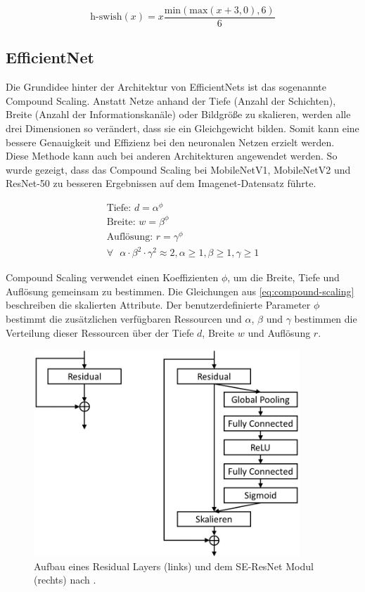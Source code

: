 \begin{equation}\label{eq:h-swish}
\text{h-swish}(x)=x\frac{\text{min}(\text{max}(x+3, 0), 6)}{6}
\end{equation}


\subsection{EfficientNet}
Die Grundidee hinter der Architektur von EfficientNets ist das sogenannte Compound Scaling. Anstatt Netze anhand der Tiefe (Anzahl der Schichten), Breite (Anzahl der Informationskanäle) oder Bildgröße zu skalieren, werden alle drei Dimensionen so verändert, dass sie ein Gleichgewicht bilden. Somit kann eine bessere Genauigkeit und Effizienz bei den neuronalen Netzen erzielt werden. Diese Methode kann auch bei anderen Architekturen angewendet werden. So wurde gezeigt, dass das Compound Scaling bei MobileNetV1, MobileNetV2 und ResNet-50 zu besseren Ergebnissen auf dem Imagenet-Datensatz führte. \cite{efficientnet}

\begin{equation}\label{eq:compound-scaling}
\begin{aligned}
\text{Tiefe: } d = \alpha^{\phi} \\
\text{Breite: } w = \beta^{\phi} \\
\text{Auflösung: } r = \gamma^{\phi} \\
\text{$\forall$ } \alpha \cdot \beta^2 \cdot \gamma^2 \approx 2, \alpha \geqslant 1, \beta \geqslant 1, \gamma \geqslant 1
\end{aligned}
\end{equation}

\mypar Compound Scaling verwendet einen Koeffizienten $\phi$, um die Breite, Tiefe und Auflösung gemeinsam zu bestimmen. Die Gleichungen aus \ref{eq:compound-scaling} beschreiben die skalierten Attribute. Der benutzerdefinierte Parameter $\phi$ bestimmt die zusätzlichen verfügbaren Ressourcen und $\alpha$, $\beta$ und $\gamma$ bestimmen die Verteilung dieser Ressourcen über der Tiefe $d$, Breite $w$ und Auflösung $r$. 

\begin{figure}[h!]
\centering
\includegraphics[width=10cm]{98_images/se_block.png}
\caption{Aufbau eines Residual Layers (links) und dem SE-ResNet Modul (rechts) nach \cite{squeeze-and-excitation-networks}.}
\label{fig:se-block-architecture}
\end{figure}

